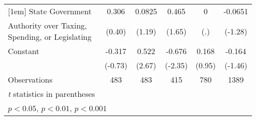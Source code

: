 {\begin{tabular}{l*{5}{c}}
[1em]
State Government    &       0.306         &      0.0825         &       0.465         &           0         &     -0.0651         \\
Authority over Taxing, Spending, or Legislating&      (0.40)         &      (1.19)         &      (1.65)         &         (.)         &     (-1.28)         \\
[1em]
Constant            &      -0.317         &       0.522\sym{**} &      -0.676\sym{*}  &       0.168         &      -0.164         \\
                    &     (-0.73)         &      (2.67)         &     (-2.35)         &      (0.95)         &     (-1.46)         \\
\hline
Observations        &         483         &         483         &         415         &         780         &        1389         \\
\hline\hline
\multicolumn{6}{l}{\footnotesize \textit{t} statistics in parentheses}\\
\multicolumn{6}{l}{\footnotesize \sym{*} \(p<0.05\), \sym{**} \(p<0.01\), \sym{***} \(p<0.001\)}\\
\end{tabular}
}
